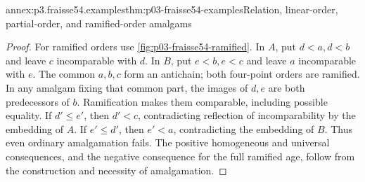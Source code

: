 \begin{annexitem}{annex:p3.fraisse54.examples}{thm:p03-fraisse54-examples}{Relation, linear-order, partial-order, and ramified-order amalgams}
\begin{proof}
For ramified orders use \cref{fig:p03-fraisse54-ramified}. In \(A\), put
\(d<a,d<b\) and leave \(c\) incomparable with \(d\). In \(B\), put
\(e<b,e<c\) and leave \(a\) incomparable with \(e\). The common
\(a,b,c\) form an antichain; both four-point orders are ramified.
In any amalgam fixing that common part, the images of \(d,e\) are both
predecessors of \(b\). Ramification makes them comparable, including
possible equality. If \(d'\leq e'\), then \(d'<c\), contradicting
reflection of incomparability by the embedding of \(A\). If
\(e'\leq d'\), then \(e'<a\), contradicting the embedding of \(B\).
Thus even ordinary amalgamation fails. The positive homogeneous and
universal consequences, and the negative consequence for the full
ramified age, follow from the construction and necessity of amalgamation.
\end{proof}
\end{annexitem}

